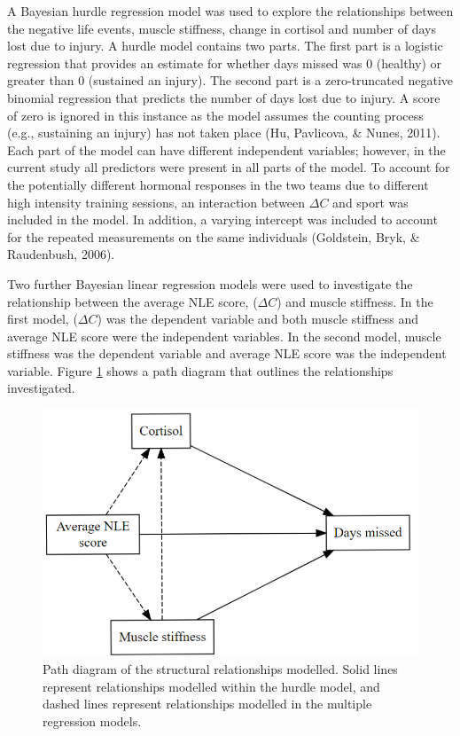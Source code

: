 \documentclass[
  english,
  man,floatsintext]{apa6}
\begin{document}
A Bayesian hurdle regression model was used to explore the relationships between the negative life events, muscle stiffness, change in cortisol and number of days lost due to injury.
A hurdle model contains two parts.
The first part is a logistic regression that provides an estimate for whether days missed was 0 (healthy) or greater than 0 (sustained an injury).
The second part is a zero-truncated negative binomial regression that predicts the number of days lost due to injury.
A score of zero is ignored in this instance as the model assumes the counting process (e.g., sustaining an injury) has not taken place (Hu, Pavlicova, \& Nunes, 2011).
Each part of the model can have different independent variables; however, in the current study all predictors were present in all parts of the model.
To account for the potentially different hormonal responses in the two teams due to different high intensity training sessions, an interaction between \(\Delta C\) and sport was included in the model.
In addition, a varying intercept was included to account for the repeated measurements on the same individuals (Goldstein, Bryk, \& Raudenbush, 2006).

Two further Bayesian linear regression models were used to investigate the relationship between the average NLE score, (\(\Delta C\)) and muscle stiffness.
In the first model, (\(\Delta C\)) was the dependent variable and both muscle stiffness and average NLE score were the independent variables.
In the second model, muscle stiffness was the dependent variable and average NLE score was the independent variable.
Figure \ref{fig:pathdiag} shows a path diagram that outlines the relationships investigated.

\begin{figure}[H]

{\centering \includegraphics[width=0.85\linewidth]{figs/study2/pathdiag} 

}

\caption{Path diagram of the structural relationships modelled. Solid lines represent relationships modelled within the hurdle model, and dashed lines represent relationships modelled in the multiple regression models.}\label{fig:pathdiag}
\end{figure}
\end{document}
